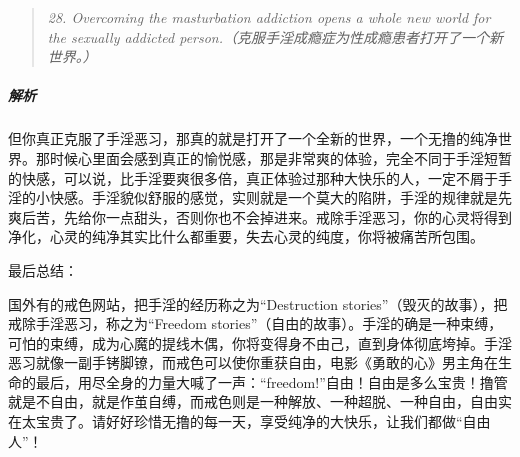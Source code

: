 \begin{quote}\it
    28. Overcoming the masturbation addiction opens a whole new world for the sexually addicted person.（克服手淫成瘾症为性成瘾患者打开了一个新世界。）
\end{quote}

\subparagraph{解析} 但你真正克服了手淫恶习，那真的就是打开了一个全新的世界，一个无撸的纯净世界。那时候心里面会感到真正的愉悦感，那是非常爽的体验，完全不同于手淫短暂的快感，可以说，比手淫要爽很多倍，真正体验过那种大快乐的人，一定不屑于手淫的小快感。手淫貌似舒服的感觉，实则就是一个莫大的陷阱，手淫的规律就是先爽后苦，先给你一点甜头，否则你也不会掉进来。戒除手淫恶习，你的心灵将得到净化，心灵的纯净其实比什么都重要，失去心灵的纯度，你将被痛苦所包围。

最后总结：

国外有的戒色网站，把手淫的经历称之为“Destruction stories”（毁灭的故事），把戒除手淫恶习，称之为“Freedom stories”（自由的故事）。手淫的确是一种束缚，可怕的束缚，成为心魔的提线木偶，你将变得身不由己，直到身体彻底垮掉。手淫恶习就像一副手铐脚镣，而戒色可以使你重获自由，电影《勇敢的心》男主角在生命的最后，用尽全身的力量大喊了一声：“freedom!”自由！自由是多么宝贵！撸管就是不自由，就是作茧自缚，而戒色则是一种解放、一种超脱、一种自由，自由实在太宝贵了。请好好珍惜无撸的每一天，享受纯净的大快乐，让我们都做“自由人”！

